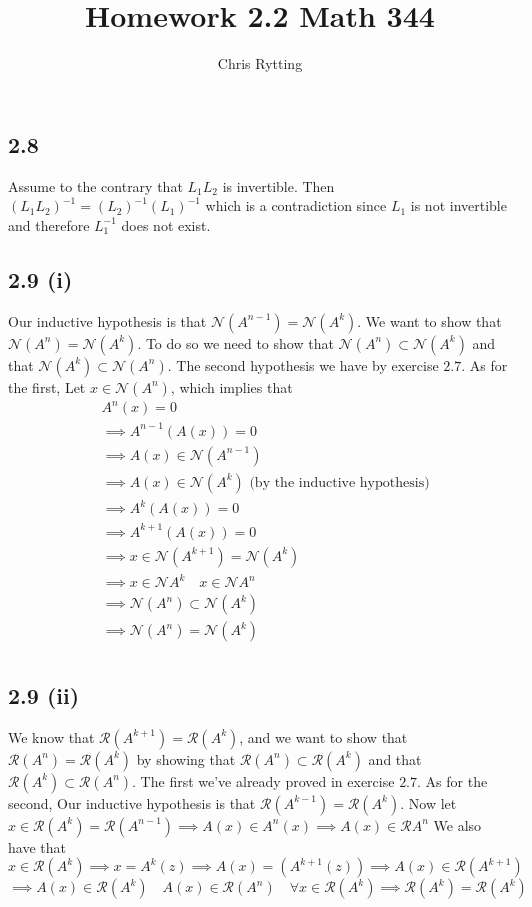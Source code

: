 \documentclass[letterpaper,12pt]{article}
\theoremstyle{definition}
\begin{document}
\title{Homework 2.2 Math 344}
\author{Chris Rytting}
\maketitle

\subsection*{2.8}
Assume to the contrary that $L_1L_2$ is invertible. Then $(L_1L_2)^{-1} = (L_2)^{-1}(L_1)^{-1}$ which is a contradiction since $L_1$ is not invertible and therefore $L_1^{-1}$ does not exist.


\subsection*{2.9 (i)}

Our inductive hypothesis is that $\mathscr{N} (A^{n-1}) = \mathscr{N} (A^k)$. 
We want to show that $\mathscr{N} (A^n) = \mathscr{N} (A^k)$. To do so we need to show that 
$\mathscr{N} (A^n) \subset \mathscr{N} (A^k)$
and that
$\mathscr{N} (A^k) \subset \mathscr{N} (A^n)$.
The second hypothesis we have by exercise $2.7$. As for the first,
Let $x\in \mathscr{N} (A^n)$, which implies that
\begin{align*}
    &A^n(x) = 0\\
    &\implies A^{n-1}(A(x)) = 0\\
    &\implies A(x) \in \mathscr{N} (A^{n-1})\\
    &\implies A(x) \in \mathscr{N} (A^{k})\text{ (by the inductive hypothesis)}\\
    &\implies A^k(A(x)) = 0\\
    &\implies A^{k+1}(A(x)) = 0\\
    &\implies x \in \mathscr{N} (A^{k+1}) = \mathscr{N} (A^{k}) \\
    &\implies x \in \mathscr{N} A^k \quad x \in \mathscr{N} A^n\\
    &\implies \mathscr{N} (A^n) \subset \mathscr{N} (A^k)\\
    &\implies \mathscr{N} (A^n)  = \mathscr{N} (A^k)\\
\end{align*}

\subsection*{2.9 (ii)}
We know that $ \mathscr{R} (A^{k+1}) =  \mathscr{R} (A^{k})$, 
and we want to show that $\mathscr{R} (A^n) = \mathscr{R} (A^k)$ by showing that
$\mathscr{R} (A^n) \subset \mathscr{R} (A^k)$
and that
$\mathscr{R} (A^k) \subset \mathscr{R} (A^n)$.
The first we've already proved in exercise $2.7$. As for the second,
Our inductive hypothesis is that $\mathscr{R} (A^{k-1}) = \mathscr{R} (A^k)$. 
Now let $x \in \mathscr{R} (A^k) = \mathscr{R} (A^{n-1}) \implies A(x) \in A^n(x) \implies A(x) \in \mathscr{R} A^n$
We also have that $x \in \mathscr{R} (A^k) \implies x = A^k(z) \implies A(x) = (A^{k+1}(z)) \implies A(x) \in \mathscr{R} (A^{k+1})$
\[\implies A(x) \in \mathscr{R} (A^k) \quad A(x) \in \mathscr{R} (A^n) \quad \forall x \in \mathscr{R} (A^k) \implies \mathscr{R} (A^k) = \mathscr{R} (A^{k})\]
\end{document}
